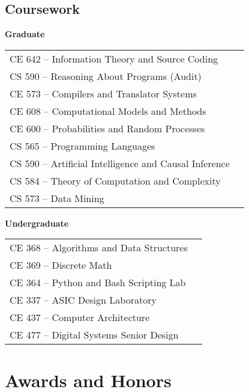 \documentclass[10pt,a4paper,sans]{moderncv}        %
\begin{document}
\begin{itemize}
\vspace{4pt}

\end{itemize}

\subsection{Coursework}

\begin{minipage}[t]{0.45\linewidth}
  \raggedright
  \textbf{Graduate}
  \begin{tabular}{ll}
    CE 642 -- Information Theory and Source Coding \\
    CS 590 -- Reasoning About Programs (Audit) \\
    CE 573 -- Compilers and Translator Systems \\
    CE 608 -- Computational Models and Methods \\
    CE 600 -- Probabilities and Random Processes \\
    CS 565 -- Programming Languages \\
    CS 590 -- Artificial Intelligence and Causal Inference \\
    CS 584 -- Theory of Computation and Complexity \\
    CS 573 -- Data Mining \\
  \end{tabular}
\end{minipage}
\hfill
\begin{minipage}[t]{0.45\linewidth}
  \raggedright
  \textbf{Undergraduate}
  \begin{tabular}{ll}
    CE 368 -- Algorithms and Data Structures \\
    CE 369 -- Discrete Math \\
    CE 364 -- Python and Bash Scripting Lab \\
    CE 337 -- ASIC Design Laboratory \\
    CE 437 -- Computer Architecture \\
    CE 477 -- Digital Systems Senior Design \\
  \end{tabular}
\end{minipage}

\section{Awards and Honors}

\vspace{4pt}
\end{document}
